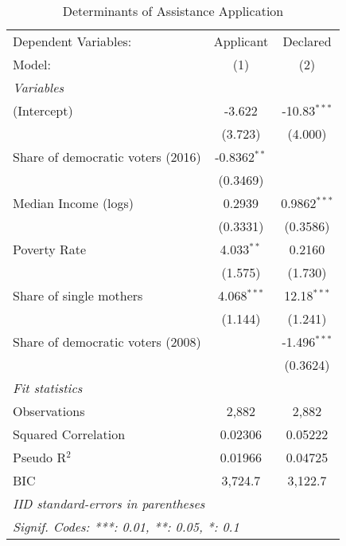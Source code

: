 
\begin{table}[htbp]
   \centering
   \caption{\label{ResultsLogit} Determinants of Assistance Application}
   \begin{tabular}{lcc}
      \tabularnewline\midrule\midrule
      Dependent Variables:              & Applicant      & Declared\\
      Model:                            & (1)            & (2)\\
      \midrule \emph{Variables} &   &  \\
      (Intercept)                       & -3.622         & -10.83$^{***}$\\
                                        & (3.723)        & (4.000)\\
      Share of democratic voters (2016) & -0.8362$^{**}$ &   \\
                                        & (0.3469)       &   \\
      Median Income (logs)              & 0.2939         & 0.9862$^{***}$\\
                                        & (0.3331)       & (0.3586)\\
      Poverty Rate                      & 4.033$^{**}$   & 0.2160\\
                                        & (1.575)        & (1.730)\\
      Share of single mothers           & 4.068$^{***}$  & 12.18$^{***}$\\
                                        & (1.144)        & (1.241)\\
      Share of democratic voters (2008) &                & -1.496$^{***}$\\
                                        &                & (0.3624)\\
      \midrule \emph{Fit statistics} &   &  \\
      Observations                      & 2,882          & 2,882\\
      Squared Correlation               & 0.02306        & 0.05222\\
      Pseudo R$^2$                      & 0.01966        & 0.04725\\
      BIC                               & 3,724.7        & 3,122.7\\
      \midrule\midrule\multicolumn{3}{l}{\emph{IID standard-errors in parentheses}}\\
      \multicolumn{3}{l}{\emph{Signif. Codes: ***: 0.01, **: 0.05, *: 0.1}}\\
   \end{tabular}
\end{table}


